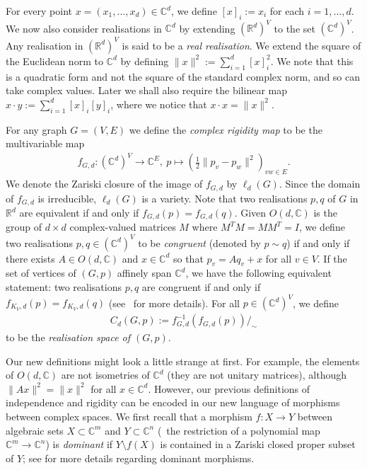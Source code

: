 \documentclass[ALCO]{cedram}
\begin{document}
For every point  $x=(x_1,\ldots,x_d) \in \mathbb{C}^d$,
we define $[x]_i := x_i$ for each $i =1,\ldots,d$.
We now also consider realisations in $\mathbb{C}^d$ by extending $(\mathbb{R}^d)^V$ to the set $(\mathbb{C}^d)^V$.
Any realisation in $(\mathbb{R}^d)^V$ is said to be a \emph{real realisation}.
We extend the square of the Euclidean norm to $\mathbb{C}^d$ by defining $\|x\|^2 := \sum_{i=1}^d [x]_i^2$.
We note that this is a quadratic form and not the square of the standard complex norm,
and so can take complex values.
Later we shall also require the bilinear map $x \cdot y := \sum_{i =1}^d [x]_i [y]_i$,
where we notice that $x \cdot x = \| x\|^2$.

For any graph $G=(V,E)$ we define the \emph{complex rigidity map} to be the multivariable map
\begin{align*}
	f_{G,d} : (\mathbb{C}^{d})^V \rightarrow \mathbb{C}^E, ~ p \mapsto \left( \frac{1}{2}\|p_v-p_w\|^2 \right)_{vw \in E}.
\end{align*}
We denote the Zariski closure of the image of $f_{G,d}$ by $\ell_d(G)$.
Since the domain of $f_{G,d}$ is irreducible,
$\ell_d(G)$ is a variety.
Note that two realisations $p,q$ of $G$ in $\mathbb{R}^d$ are equivalent if and only if $f_{G,d}(p)=f_{G,d}(q)$.
Given $O(d, \mathbb{C})$ is the group of $d \times d$ complex-valued matrices $M$ where $M^T M = M M^T = I$,
we define two realisations $p,q \in (\mathbb{C}^{d})^V$ to be \emph{congruent} (denoted by $p \sim q$) if and only if there exists $A \in O(d, \mathbb{C})$ and $x \in \mathbb{C}^{d}$ so that $p_v = Aq_v + x$ for all $v \in V$.
If the set of vertices of $(G,p)$ affinely span $\mathbb{C}^d$,
we have the following equivalent statement:
two realisations $p,q$ are congruent if and only if $f_{K_V,d}(p) = f_{K_V,d}(q)$ (see~\cite[Section 10]{Gortler2014} for more details).
For all $p \in (\mathbb{C}^{d})^V$,
we define 
\begin{align*}
	C_d(G,p) := f^{-1}_{G,d} (f_{G,d}(p))/_\sim
\end{align*}
to be the \emph{realisation space of $(G,p)$}.

Our new definitions might look a little strange at first.
For example,
the elements of $O(d, \mathbb{C})$ are not isometries of $\mathbb{C}^d$ (\ie they are not unitary matrices),
although $\|Ax\|^2 = \|x\|^2$ for all $x \in \mathbb{C}^d$.
However, our previous definitions of independence and rigidity can be encoded in our new language of morphisms between complex spaces.
We first recall that a morphism $f : X \rightarrow Y$ between algebraic sets $X \subset \mathbb{C}^m$ and $Y \subset \mathbb{C}^n$ (\ie~the restriction of a polynomial map $\mathbb{C}^m \rightarrow \mathbb{C}^n$) is \emph{dominant} if $Y \setminus f(X)$ is contained in a Zariski closed proper subset of $Y$;
see  for more details regarding dominant morphisms.
\end{document}
